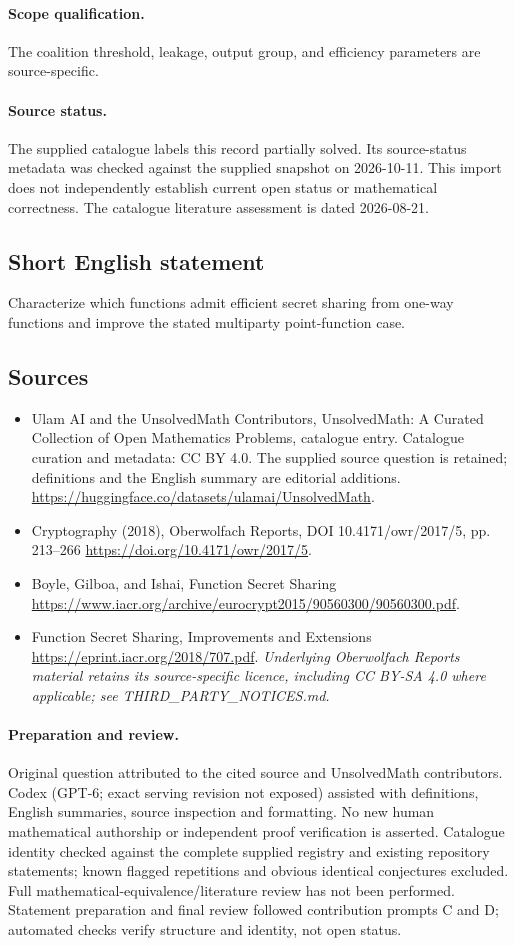 \documentclass[11pt]{article}
\begin{document}
\paragraph{Scope qualification.}
The coalition threshold, leakage, output group, and efficiency parameters are source-specific.
\paragraph{Source status.}
The supplied catalogue labels this record partially solved. Its source-status metadata was checked against the supplied snapshot on 2026-10-11. This import does not independently establish current open status or mathematical correctness. The catalogue literature assessment is dated 2026-08-21.
\subsection{Short English statement}
Characterize which functions admit efficient secret sharing from one-way functions and improve the stated multiparty point-function case.
\subsection{Sources}
\begin{itemize}
\item[S1] Ulam AI and the UnsolvedMath Contributors, UnsolvedMath: A Curated Collection of Open Mathematics Problems, catalogue entry. Catalogue curation and metadata: CC BY 4.0. The supplied source question is retained; definitions and the English summary are editorial additions.
\url{https://huggingface.co/datasets/ulamai/UnsolvedMath}.
\item[S2] Cryptography (2018), Oberwolfach Reports, DOI 10.4171/owr/2017/5, pp. 213--266
\url{https://doi.org/10.4171/owr/2017/5}.
\item[S3] Boyle, Gilboa, and Ishai, Function Secret Sharing
\url{https://www.iacr.org/archive/eurocrypt2015/90560300/90560300.pdf}.
\item[S4] Function Secret Sharing, Improvements and Extensions
\url{https://eprint.iacr.org/2018/707.pdf}.
\textit{Underlying Oberwolfach Reports material retains its source-specific licence, including CC BY-SA 4.0 where applicable; see THIRD\_PARTY\_NOTICES.md.}
\end{itemize}
\paragraph{Preparation and review.}
Original question attributed to the cited source and UnsolvedMath contributors. Codex (GPT-6; exact serving revision not exposed) assisted with definitions, English summaries, source inspection and formatting. No new human mathematical authorship or independent proof verification is asserted. Catalogue identity checked against the complete supplied registry and existing repository statements; known flagged repetitions and obvious identical conjectures excluded. Full mathematical-equivalence/literature review has not been performed. Statement preparation and final review followed contribution prompts C and D; automated checks verify structure and identity, not open status.
\label{end:statement}
\end{document}

